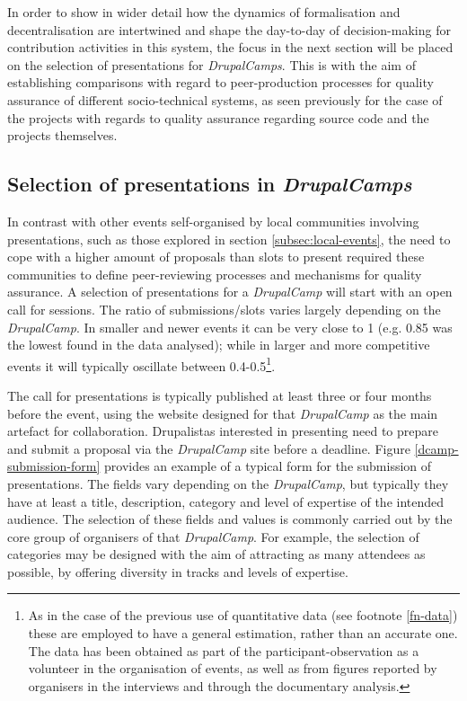 In order to show in wider detail how the dynamics of formalisation and decentralisation are intertwined and shape the day-to-day of decision-making for contribution activities in this system, the focus in the next section will be placed on the selection of presentations for \textit{DrupalCamps}. This is with the aim of establishing comparisons with regard to peer-production processes for quality assurance of different socio-technical systems, as seen previously for the case of the projects with regards to quality assurance regarding source code and the projects themselves.

\subsection*{Selection of presentations in \textit{DrupalCamps}}
\label{subsec:dcamps-dtd}

In contrast with other events self-organised by local communities involving presentations, such as those explored in section \ref{subsec:local-events}, the need to cope with a higher amount of proposals than slots to present required these communities to define peer-reviewing processes and mechanisms for quality assurance. A selection of presentations for a \textit{DrupalCamp} will start with an open call for sessions. The ratio of submissions/slots varies largely depending on the \textit{DrupalCamp}. In smaller and newer events it can be very close to 1 (e.g. 0.85 was the lowest found in the data analysed); while in larger and more competitive events it will typically oscillate between 0.4-0.5\footnote{As in the case of the previous use of quantitative data (see footnote \ref{fn-data}) these are employed to have a general estimation, rather than an accurate one. The data has been obtained as part of the participant-observation as a volunteer in the organisation of events, as well as from figures reported by organisers in the interviews and through the documentary analysis.}.

The call for presentations is typically published at least three or four months before the event, using the website designed for that \textit{DrupalCamp} as the main artefact for collaboration. Drupalistas interested in presenting need to prepare and submit a proposal via the \textit{DrupalCamp} site before a deadline. Figure \ref{dcamp-submission-form} provides an example of a typical form for the submission of presentations. The fields vary depending on the \textit{DrupalCamp}, but typically they have at least a title, description, category and level of expertise of the intended audience. The selection of these fields and values is commonly carried out by the core group of organisers of that \textit{DrupalCamp}. For example, the selection of categories may be designed with the aim of attracting as many attendees as possible, by offering diversity in tracks and levels of expertise.

